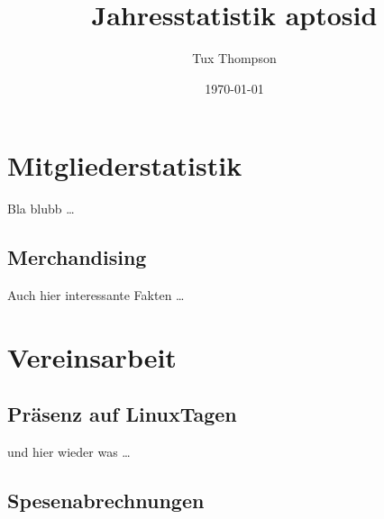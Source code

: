 \documentclass{scrartcl}
\title{Jahresstatistik aptosid}
\author{Tux Thompson}
\date{\today}
\begin{document}
\maketitle
\tableofcontents

\section{Mitgliederstatistik}
Bla blubb \ldots
\subsection{Merchandising}
Auch hier interessante Fakten \ldots

\section{Vereinsarbeit}
\subsection{Präsenz auf LinuxTagen}
und hier wieder was \ldots
\subsection{Spesenabrechnungen}
\end{document}
